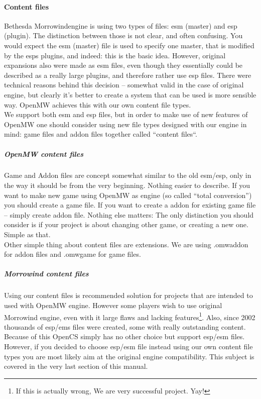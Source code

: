 \paragraph{Content files}
Bethesda Morrowind\texttrademark engine is using two types of files: esm (master) and esp (plugin). The distinction between those is not clear, and often confusing. You would expect the esm (master) file is used to specify one master, that is modified by the esps plugins, and indeed: this is the basic idea. However, original expansions also were made as esm files, even though they essentially could be described as a really large plugins, and therefore rather use esp files. There were technical reasons behind this decision -- somewhat valid in the case of original engine, but clearly it's better to create a system that can be used is more sensible way. Open{MW} achieves this with our own content file types.\\
We support both esm and esp files, but in order to make use of new features of OpenMW one should consider using new file types designed with our engine in mind: game files and addon files together called ``content files``.\\

\subparagraph{Open{MW} content files}
Game and Addon files are concept somewhat similar to the old esm/esp, only in the way it should be from the very beginning. Nothing easier to describe. If you want to make new game using Open{MW} as engine (so called ``total conversion'') you should create a game file. If you want to create a addon for existing game file -- simply create addon file. Nothing else matters: The only distinction you should consider is if your project is about changing other game, or creating a new one. Simple as that.\\

Other simple thing about content files are extensions. We are using .omwaddon for addon files and .omwgame for game files.\\


\subparagraph{Morrowind content files}
Using our content files is recommended solution for projects that are intended to used with Open{MW} engine. However some players wish to use original Morrowind engine, even with it large flaws and lacking features\footnote{If this is actually wrong, We are very successful project. Yay!}. Also, since 2002 thousands of esp/ems files were created, some with really outstanding content. Because of this Open{CS} simply has no other choice but support esp/esm files. However, if you decided to choose esp/esm file instead using our own content file types you are most likely aim at the original engine compatibility. This subject is covered in the very last section of this manual.\\ %

